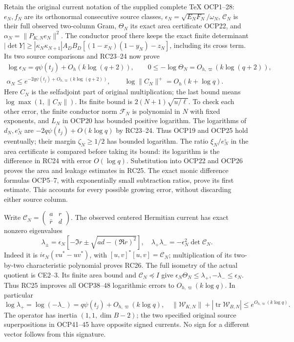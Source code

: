 \documentclass[10pt]{article}
\begin{document}
Retain the original current notation of the supplied complete TeX OCP1--28: \(e_N,f_N\) are its orthonormal consecutive source classes, \(\epsilon_N=\sqrt{E_NF_N}/\omega_N\), \(\mathcal C_N\) is their full observed two-column Gram, \(\Theta_N\) its exact area certificate OCP22, and \(\alpha_N=\|P_{K,N}e_N\|^2\). The conductor proof there keeps the exact finite determinant \(|\det Y|\ge|\kappa_N\kappa_{N+1}|A_DB_D[(1-x_N)(1-y_N)-z_N]\), including its cross term. Its two source comparisons and RC23--24 now prove \[
\boxed{\begin{gathered}
\log\epsilon_N=q\psi(t_j)+O_h(k\log(q+2)),\qquad
0\le-\log\Theta_N=O_{h,\varpi}(k\log(q+2)),\\
\alpha_N\le e^{-2q\psi(t_j)+O_{h,\varpi}(k\log(q+2))},\qquad
\log\|C_N\|^+=O_h(k+\log q).
\end{gathered}}
\tag{RC25}
\] Here \(C_N\) is the selfadjoint part of original multiplication; the last bound means \(\log\max(1,\|C_N\|)\). Its finite bound is \(2(N+1)\sqrt{u/\ell}\). To check each other error, the finite conductor norm \(\mathcal F_N\) is polynomial in \(N\) with fixed exponents, and \(L_N\) in OCP20 has bounded positive logarithm. The logarithms of \(d_N,e_N^\circ\) are \(-2q\psi(t_j)+O(k\log q)\) by RC23--24. Thus OCP19 and OCP25 hold eventually; their margin \(\zeta_N\ge1/2\) has bounded logarithm. The ratio \(\xi_N/e_N^\circ\) in the area certificate is compared before taking its bound: its logarithm is the difference in RC24 with error \(O(\log q)\). Substitution into OCP22 and OCP26 proves the area and leakage estimates in RC25. The exact monic difference formulas OCP5--7, with exponentially small subtraction ratios, prove its first estimate. This accounts for every possible growing error, without discarding either source column.

Write \(\mathcal C_N=\left(\begin{smallmatrix}a&r\\\bar r&d\end{smallmatrix}\right)\). The observed centered Hermitian current has exact nonzero eigenvalues \[
\lambda_\pm=\epsilon_N[-\Im r\pm\sqrt{ad-(\Re r)^2}],
\quad\lambda_+\lambda_-=-\epsilon_N^2\det\mathcal C_N.
\tag{RC26}
\] Indeed it is \(i\epsilon_N(vu^*-uv^*)\), with \([u,v]^*[u,v]=\mathcal C_N\); multiplication of its two-by-two characteristic polynomial proves RC26. The full isometry of the actual quotient is CE2--3. Its finite area bound and \(\mathcal C_N\preceq I\) give \(\epsilon_N\Theta_N\le\lambda_+,-\lambda_-\le\epsilon_N\). Thus RC25 improves all OCP38--48 logarithmic errors to \(O_{h,\varpi}(k\log q)\). In particular \[
\log\lambda_+=\log(-\lambda_-)=q\psi(t_j)+O_{h,\varpi}(k\log q),
\quad \|\mathscr W_{K,N}\|+|\operatorname{tr}\mathscr W_{B,N}|
\le e^{O_{h,\varpi}(k\log q)}.
\tag{RC27}
\] The operator has inertia \((1,1,\dim B-2)\); the two specified original source superpositions in OCP41--45 have opposite signed currents. No sign for a different vector follows from this signature.
\end{document}
